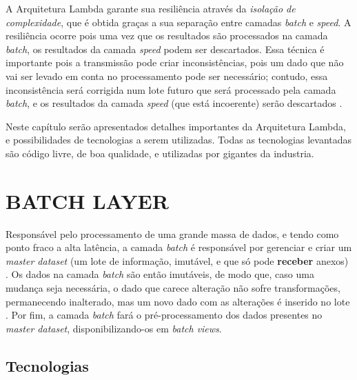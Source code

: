 A Arquitetura Lambda garante sua resiliência através da \textit{isolação de
complexidade}, que é obtida graças a sua separação entre camadas \textit{batch}
e \textit{speed}. A resiliência ocorre pois uma vez que os resultados são
processados na camada \textit{batch}, os resultados da camada \textit{speed}
podem ser descartados. Essa técnica é importante pois a transmissão pode
criar inconsistências, pois um dado que não vai ser levado em conta no
processamento pode ser necessário; contudo, essa inconsistência será corrigida
num lote futuro que será processado pela camada \textit{batch}, e os resultados
da camada \textit{speed} (que está incoerente) serão descartados
\cite{marz2015}.

Neste capítulo serão apresentados detalhes importantes da Arquitetura Lambda, e
possibilidades de tecnologias a serem utilizadas. Todas as tecnologias
levantadas são código livre, de boa qualidade, e utilizadas por gigantes da
industria.

\section{BATCH LAYER}

Responsável pelo processamento de uma grande massa de dados, e tendo como ponto
fraco a alta latência, a camada \textit{batch} é responsável por gerenciar e
criar um \textit{master dataset} (um lote de informação, imutável, e que só
pode \textbf{receber} anexos) \cite{marz2015}. Os dados na camada \textit{batch}
são então imutáveis, de modo que, caso uma mudança seja necessária, o dado que
carece alteração não sofre transformações, permanecendo inalterado, mas um novo
dado com as alterações é inserido no lote \cite{marz2015}. Por fim, a camada
\textit{batch} fará o pré-processamento dos dados presentes no
\textit{master dataset}, disponibilizando-os em \textit{batch views}.

\subsection{Tecnologias}

